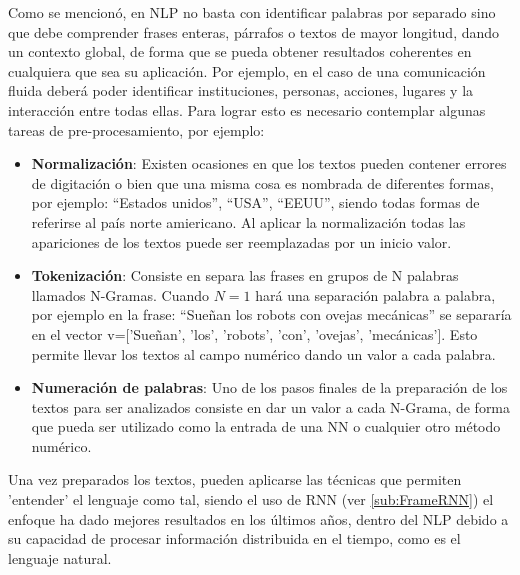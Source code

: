         Como se mencionó, en NLP no basta con identificar palabras por separado sino que debe comprender frases enteras, párrafos o textos de mayor longitud, dando un contexto global, de forma que se pueda obtener resultados coherentes en cualquiera que sea su aplicación. Por ejemplo, en el caso de una comunicación fluida deberá poder identificar instituciones, personas, acciones, lugares y la interacción entre todas ellas. Para lograr esto es necesario contemplar algunas tareas de pre-procesamiento, por ejemplo:
        
        \begin{itemize}
            \setlength\itemsep{1em}
            
            \item \textbf{Normalización}: Existen ocasiones en que los textos pueden contener errores de digitación o bien que una misma cosa es nombrada de diferentes formas, por ejemplo: ``Estados unidos'', ``USA'', ``EEUU'', siendo todas formas de referirse al país norte amiericano. Al aplicar la normalización todas las apariciones de los textos puede ser reemplazadas por un inicio valor.
        
            \item \textbf{Tokenización}: Consiste en separa las frases en grupos de N palabras llamados N-Gramas. Cuando $N=1$ hará una separación palabra a palabra, por ejemplo en la frase: ``Sueñan los robots con ovejas mecánicas'' se separaría en el vector v=['Sueñan', 'los', 'robots', 'con', 'ovejas', 'mecánicas']. Esto permite llevar los textos al campo numérico dando un valor a cada palabra.
            
            \item \textbf{Numeración de palabras}: Uno de los pasos finales de la preparación de los textos para ser analizados consiste en dar un valor a cada N-Grama, de forma que pueda ser utilizado como la entrada de una NN o cualquier otro método numérico.
            
        \end{itemize}
        
        Una vez preparados los textos, pueden aplicarse las técnicas que permiten 'entender' el lenguaje como tal, siendo el uso de RNN (ver \ref{sub:FrameRNN}) el enfoque ha dado mejores resultados en los últimos años, dentro del NLP debido a su capacidad de procesar información distribuida en el tiempo, como es el lenguaje natural.
        
